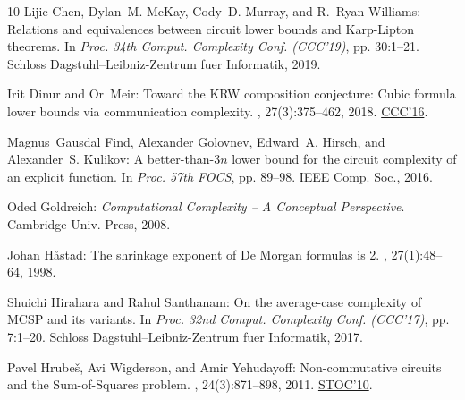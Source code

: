 \documentclass[11pt]{article}
\numberwithin{equation}{section}
\theoremstyle{definition}
\theoremstyle{plain}
\begin{document}
\begin{thebibliography}{10}
{\sc Lijie Chen, Dylan~M. McKay, Cody~D. Murray, and R.~Ryan Williams}:
  Relations and equivalences between circuit lower bounds and {K}arp-{L}ipton
  theorems.
\newblock In {\em Proc. 34th Comput. Complexity Conf. (CCC'19)}, pp. 30:1--21.
  Schloss Dagstuhl--Leibniz-Zentrum fuer Informatik, 2019.

{\sc Irit Dinur and Or~Meir}: Toward the {KRW} composition conjecture: {C}ubic
  formula lower bounds via communication complexity.
, 27(3):375--462, 2018.
\newblock \prelim \href{https://doi.org/10.4230/LIPIcs.CCC.2016.3}{CCC'16}.

{\sc Magnus~Gausdal Find, Alexander Golovnev, Edward~A. Hirsch, and
  Alexander~S. Kulikov}: A better-than-$3n$ lower bound for the circuit
  complexity of an explicit function.
\newblock In {\em Proc. 57th FOCS}, pp. 89--98. IEEE Comp. Soc., 2016.

{\sc Oded Goldreich}: {\em Computational Complexity -- {A} Conceptual
  Perspective}.
\newblock Cambridge Univ. Press, 2008.

{\sc Johan H{\aa}stad}: The shrinkage exponent of {De} {M}organ formulas is 2.
, 27(1):48--64, 1998.
\newblock [\epfmtdoi{10.1137/S0097539794261556}]

{\sc Shuichi Hirahara and Rahul Santhanam}: On the average-case complexity of
  {MCSP} and its variants.
\newblock In {\em Proc. 32nd Comput. Complexity Conf. (CCC'17)}, pp. 7:1--20.
  Schloss Dagstuhl--Leibniz-Zentrum fuer Informatik, 2017.

{\sc Pavel Hrube{\v{s}}, Avi Wigderson, and Amir Yehudayoff}: Non-commutative
  circuits and the {S}um-of-{S}quares problem.
, 24(3):871--898, 2011.
\newblock \prelim \href{https://doi.org/10.1145/1806689.1806781}{STOC'10}.


\end{thebibliography}
\end{document}
